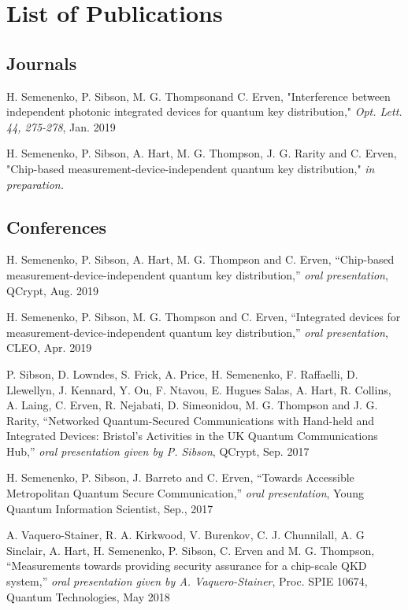 %
{\setlength{\parindent}{0pt} %
\abnormalparskip{18pt} %
\chapter*{List of Publications}
\section*{Journals}

H. Semenenko, P. Sibson, M. G. Thompsonand C. Erven, "Interference between independent photonic integrated devices for quantum key distribution," \textit{Opt. Lett. 44, 275-278}, Jan. 2019 

H. Semenenko, P. Sibson, A. Hart, M. G. Thompson, J. G. Rarity  and C. Erven, "Chip-based measurement-device-independent quantum key distribution," \textit{in preparation.} 

\section*{Conferences}

H. Semenenko, P. Sibson, A. Hart, M. G. Thompson and C. Erven, ``Chip-based measurement-device-independent quantum key distribution,'' \textit{oral presentation}, QCrypt, Aug. 2019

H. Semenenko, P. Sibson, M. G. Thompson and C. Erven, ``Integrated devices for measurement-device-independent quantum key distribution,'' \textit{oral presentation}, CLEO, Apr. 2019

P. Sibson, D. Lowndes, S. Frick, A. Price, H. Semenenko, F. Raffaelli, D. Llewellyn, J. Kennard, Y. Ou, F. Ntavou, E. Hugues Salas, A. Hart, R. Collins, A. Laing, C. Erven, R. Nejabati, D. Simeonidou, M. G. Thompson and J. G. Rarity, ``Networked Quantum-Secured Communications with Hand-held and Integrated Devices: Bristol’s Activities in the UK Quantum Communications Hub,'' \textit{oral presentation given by P. Sibson}, QCrypt, Sep. 2017

H. Semenenko, P. Sibson, J. Barreto and C. Erven, ``Towards Accessible Metropolitan Quantum Secure Communication,'' \textit{oral presentation}, Young Quantum Information Scientist, Sep., 2017 

A. Vaquero-Stainer, R. A. Kirkwood, V. Burenkov, C. J. Chunnilall, A. G Sinclair, A. Hart, H. Semenenko, P. Sibson, C. Erven and M. G. Thompson, ``Measurements towards providing security assurance for a chip-scale QKD system,'' \textit{oral presentation given by A. Vaquero-Stainer}, Proc. SPIE 10674, Quantum Technologies, May 2018

}
